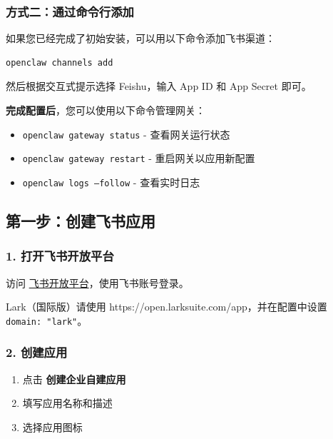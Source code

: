 \subsubsection{方式二：通过命令行添加}


如果您已经完成了初始安装，可以用以下命令添加飞书渠道：

\begin{lstlisting}[language=bash]
openclaw channels add
\end{lstlisting}


然后根据交互式提示选择 Feishu，输入 App ID 和 App Secret 即可。

 \textbf{完成配置后}，您可以使用以下命令管理网关：

\begin{itemize}
  \item \texttt{openclaw gateway status} - 查看网关运行状态
  \item \texttt{openclaw gateway restart} - 重启网关以应用新配置
  \item \texttt{openclaw logs --follow} - 查看实时日志
\end{itemize}


\hrulefill


\subsection{第一步：创建飞书应用}


\subsubsection{1. 打开飞书开放平台}


访问 \href{https://open.feishu.cn/app}{飞书开放平台}，使用飞书账号登录。

Lark（国际版）请使用 https://open.larksuite.com/app，并在配置中设置 \texttt{domain: "lark"}。

\subsubsection{2. 创建应用}


\begin{enumerate}
  \item 点击 \textbf{创建企业自建应用}
  \item 填写应用名称和描述
  \item 选择应用图标
\end{enumerate}



